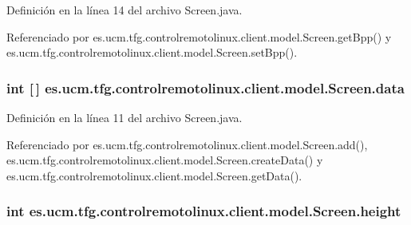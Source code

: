 Definición en la línea 14 del archivo Screen.\-java.



Referenciado por es.\-ucm.\-tfg.\-controlremotolinux.\-client.\-model.\-Screen.\-get\-Bpp() y es.\-ucm.\-tfg.\-controlremotolinux.\-client.\-model.\-Screen.\-set\-Bpp().

\hypertarget{classes_1_1ucm_1_1tfg_1_1controlremotolinux_1_1client_1_1model_1_1Screen_a9dfbbee16f33137483d67ab15ebd5adb}{
\subsubsection[{data}]{\setlength{\rightskip}{0pt plus 5cm}int \mbox{[}$\,$\mbox{]} es.\-ucm.\-tfg.\-controlremotolinux.\-client.\-model.\-Screen.\-data\hspace{0.3cm}{\ttfamily [private]}}}\label{classes_1_1ucm_1_1tfg_1_1controlremotolinux_1_1client_1_1model_1_1Screen_a9dfbbee16f33137483d67ab15ebd5adb}


Definición en la línea 11 del archivo Screen.\-java.



Referenciado por es.\-ucm.\-tfg.\-controlremotolinux.\-client.\-model.\-Screen.\-add(), es.\-ucm.\-tfg.\-controlremotolinux.\-client.\-model.\-Screen.\-create\-Data() y es.\-ucm.\-tfg.\-controlremotolinux.\-client.\-model.\-Screen.\-get\-Data().

\hypertarget{classes_1_1ucm_1_1tfg_1_1controlremotolinux_1_1client_1_1model_1_1Screen_a8c3d5e32772854cbe34a7e7d090537f9}{
\subsubsection[{height}]{\setlength{\rightskip}{0pt plus 5cm}int es.\-ucm.\-tfg.\-controlremotolinux.\-client.\-model.\-Screen.\-height\hspace{0.3cm}{\ttfamily [private]}}}\label{classes_1_1ucm_1_1tfg_1_1controlremotolinux_1_1client_1_1model_1_1Screen_a8c3d5e32772854cbe34a7e7d090537f9}


